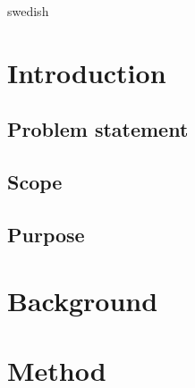 \addto\captionsenglish{\renewcommand{\chaptername}{}}
\renewcommand*{\chapternamenum}{}
\renewcommand*{\afterchapternum}{ }

\frontmatter
\pagestyle{empty}
\removepagenumbers
\maketitle
{}
\begin{vplace}[0.5]
\begin{abstract}

\end{abstract}
\end{vplace}
\clearpage
\begin{vplace}[0.5]
\begin{foreignabstract}{swedish}

\end{foreignabstract}
\end{vplace}
\clearpage
\tableofcontents*
\mainmatter
\pagestyle{newchap}

\chapter{Introduction}



\section{Problem statement}



\section{Scope}

\section{Purpose}


\chapter{Background}



\chapter{Method}


